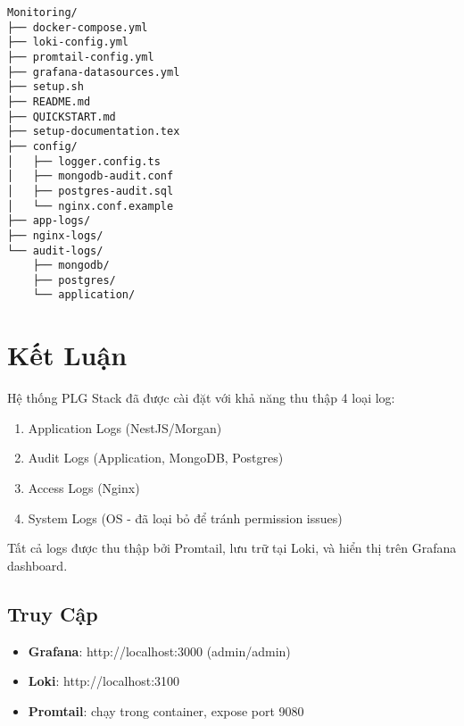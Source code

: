 \documentclass[a4paper,12pt]{article}
\begin{document}
\begin{lstlisting}
Monitoring/
├── docker-compose.yml
├── loki-config.yml
├── promtail-config.yml
├── grafana-datasources.yml
├── setup.sh
├── README.md
├── QUICKSTART.md
├── setup-documentation.tex
├── config/
│   ├── logger.config.ts
│   ├── mongodb-audit.conf
│   ├── postgres-audit.sql
│   └── nginx.conf.example
├── app-logs/
├── nginx-logs/
└── audit-logs/
    ├── mongodb/
    ├── postgres/
    └── application/
\end{lstlisting}

\section{Kết Luận}

Hệ thống PLG Stack đã được cài đặt với khả năng thu thập 4 loại log:
\begin{enumerate}
    \item Application Logs (NestJS/Morgan)
    \item Audit Logs (Application, MongoDB, Postgres)
    \item Access Logs (Nginx)
    \item System Logs (OS - đã loại bỏ để tránh permission issues)
\end{enumerate}

Tất cả logs được thu thập bởi Promtail, lưu trữ tại Loki, và hiển thị trên Grafana dashboard.

\subsection{Truy Cập}

\begin{itemize}
    \item \textbf{Grafana}: http://localhost:3000 (admin/admin)
    \item \textbf{Loki}: http://localhost:3100
    \item \textbf{Promtail}: chạy trong container, expose port 9080
\end{itemize}
\end{document}
